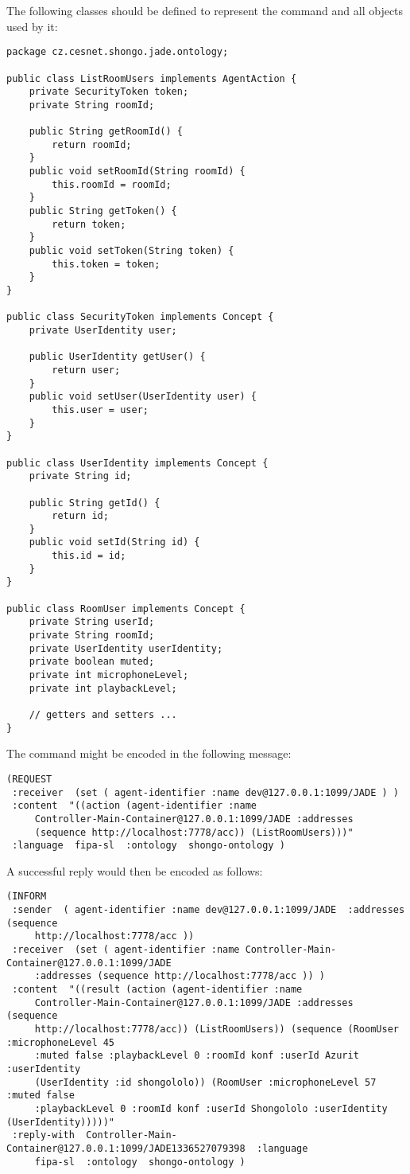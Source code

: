\documentclass[a4paper]{report}
\begin{document}
The following classes should be defined to represent the command and all objects used by it:
\begin{verbatim}
package cz.cesnet.shongo.jade.ontology;

public class ListRoomUsers implements AgentAction {
    private SecurityToken token;
    private String roomId;

    public String getRoomId() {
        return roomId;
    }
    public void setRoomId(String roomId) {
        this.roomId = roomId;
    }
    public String getToken() {
        return token;
    }
    public void setToken(String token) {
        this.token = token;
    }
}

public class SecurityToken implements Concept {
    private UserIdentity user;

    public UserIdentity getUser() {
        return user;
    }
    public void setUser(UserIdentity user) {
        this.user = user;
    }
}

public class UserIdentity implements Concept {
    private String id;

    public String getId() {
        return id;
    }
    public void setId(String id) {
        this.id = id;
    }
}

public class RoomUser implements Concept {
    private String userId;
    private String roomId;
    private UserIdentity userIdentity;
    private boolean muted;
    private int microphoneLevel;
    private int playbackLevel;

    // getters and setters ...
}
\end{verbatim}

The command might be encoded in the following message:
\begin{verbatim}
(REQUEST
 :receiver  (set ( agent-identifier :name dev@127.0.0.1:1099/JADE ) )
 :content  "((action (agent-identifier :name
     Controller-Main-Container@127.0.0.1:1099/JADE :addresses
     (sequence http://localhost:7778/acc)) (ListRoomUsers)))"
 :language  fipa-sl  :ontology  shongo-ontology )
\end{verbatim}

A successful reply would then be encoded as follows:
\begin{verbatim}
(INFORM
 :sender  ( agent-identifier :name dev@127.0.0.1:1099/JADE  :addresses (sequence
     http://localhost:7778/acc ))
 :receiver  (set ( agent-identifier :name Controller-Main-Container@127.0.0.1:1099/JADE
     :addresses (sequence http://localhost:7778/acc )) )
 :content  "((result (action (agent-identifier :name
     Controller-Main-Container@127.0.0.1:1099/JADE :addresses (sequence
     http://localhost:7778/acc)) (ListRoomUsers)) (sequence (RoomUser :microphoneLevel 45
     :muted false :playbackLevel 0 :roomId konf :userId Azurit :userIdentity
     (UserIdentity :id shongololo)) (RoomUser :microphoneLevel 57 :muted false
     :playbackLevel 0 :roomId konf :userId Shongololo :userIdentity (UserIdentity)))))"
 :reply-with  Controller-Main-Container@127.0.0.1:1099/JADE1336527079398  :language
     fipa-sl  :ontology  shongo-ontology )
\end{verbatim}






\end{document}
